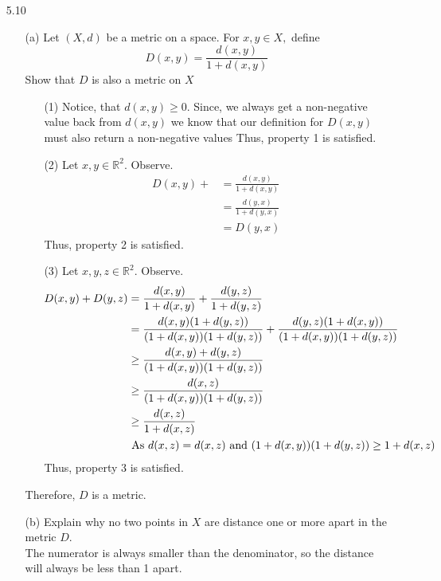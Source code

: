 \documentclass[12pt]{article}
\newcommand{\R}{\mathbb{R}}
\begin{document}
\begin{enumerate}
\begin{enumerate}
		\end{enumerate}
		\item[5.10]
		\begin{enumerate}
			\item[(a)] Let $( X , d )$ be a metric on a space. For $x , y \in X ,$ define
			\[D ( x , y ) = \frac { d ( x , y ) } { 1 + d ( x , y ) }\]
			Show that $D$ is also a metric on $ X $
			\begin{enumerate}
				\item[(1)] Notice, that $ d(x,y)\geq0 $. Since, we always get a non-negative value back from $ d(x,y) $ we know that our definition for $ D(x,y) $ must also return a non-negative values
				Thus, property 1 is satisfied.
				\item[(2)] Let $ x,y\in\R^2 $. Observe.
				\begin{align*}
				D(x,y) +  &= \frac{d(x,y)}{1+d(x,y)}\\
				&= \frac{d(y,x)}{1+d(y,x)}\\
				&= D(y,x)
				\end{align*}
				Thus, property 2 is satisfied.
				\item[(3)] Let $ x,y,z\in\R^2 $. Observe.
				\begin{align*}
				D(x,y)+D(y,z) &= \frac{d(x,y)}{1+d(x,y)} + \frac{d(y,z)}{1+d(y,z)} \\
				&= \frac{d(x,y)(1+d(y,z))}{(1+d(x,y))(1+d(y,z))} + \frac{d(y,z)(1+d(x,y))}{(1+d(x,y))(1+d(y,z))}\\
				&\geq \frac{d(x,y)+d(y,z)}{(1+d(x,y))(1+d(y,z))}\\
				&\geq \frac{d(x,z)}{(1+d(x,y))(1+d(y,z))}\\
				&\geq \frac{d(x,z)}{1+d(x,z)} \\
				&\text{ As $ d(x,z)=d(x,z)  $ and $ (1+d(x,y))(1+d(y,z)) \geq 1+d(x,z)$ }
				\end{align*}
				Thus, property 3 is satisfied.
			\end{enumerate}
			Therefore, $D$ is a metric.
			\item[(b)] Explain why no two points in $X$ are distance one or more apart in the metric $D .$\\
			The numerator is always smaller than the denominator, so the distance will always be less than 1 apart.
		\end{enumerate}
		

\end{enumerate}
\end{document}

